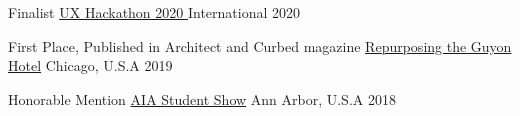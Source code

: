 




\begin{cvhonors}

  \cvhonor
    {Finalist} %
    {\href{http://bit.ly/barkcasestudy}{UX Hackathon 2020 }}%
    {International} %
    {2020} %

  \cvhonor
    {First Place, Published in Architect and Curbed magazine } %
    {\href{https://bit.ly/319weik}{Repurposing the Guyon Hotel}} %
    {Chicago, U.S.A} %
    {2019} %

  \cvhonor
    {Honorable Mention} %
    {\href{https://bit.ly/2NKNNCb}{AIA Student Show}} %
    {Ann Arbor, U.S.A} %
    {2018} %


\end{cvhonors}


